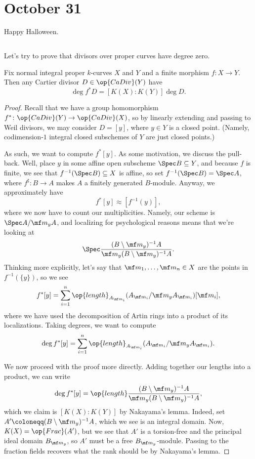 \documentclass[../notes.tex]{subfiles}
\begin{document}
\section{October 31}

Happy Halloween.

\subsection{}
Let's try to prove that divisors over proper curves have degree zero.
\begin{proposition}
	Fix normal integral proper $k$-curves $X$ and $Y$ and a finite morphism $f\colon X\to Y$. Then any Cartier divisor $D\in\op{CaDiv}(Y)$ have
	\[\deg f^*D=[K(X):K(Y)]\deg D.\]
\end{proposition}
\begin{proof}
	Recall that we have a group homomorphism $f^*\colon\op{CaDiv}(Y)\to\op{CaDiv}(X)$, so by linearly extending and passing to Weil divisors, we may consider $D=[y]$, where $y\in Y$ is a closed point. (Namely, codimension-$1$ integral closed subschemes of $Y$ are just closed points.)

	As such, we want to compute $f^*[y]$. As some motivation, we discuss the pull-back. Well, place $y$ in some affine open subscheme $\Spec B\subseteq Y$, and because $f$ is finite, we see that $f^{-1}(\Spec B)\subseteq X$ is affine, so set $f^{-1}(\Spec B)=\Spec A$, where $f^\sharp\colon B\to A$ makes $A$ a finitely generated $B$-module. Anyway, we approximately have
	\[f^*[y]\approx\left[f^{-1}(y)\right],\]
	where we now have to count our multiplicities. Namely, our scheme is $\Spec A/\mf m_yA$, and localizing for psychological reasons means that we're looking at
	\[\Spec\frac{(B\setminus\mf m_y)^{-1}A}{\mf m_y(B\setminus\mf m_y)^{-1}A}.\]
	Thinking more explicitly, let's say that $\mf m_1,\ldots,\mf m_n\in X$ are the points in $f^{-1}(\{y\})$, so we see
	\[f^*[y]=\sum_{i=1}^n\op{length}_{A_{\mf m_i}}(A_{\mf m_i}/\mf m_yA_{\mf m_i})[\mf m_i],\]
	where we have used the decomposition of Artin rings into a product of its localizations. Taking degrees, we want to compute
	\[\deg f^*[y]=\sum_{i=1}^n\op{length}_{A_{\mf m_i}}(A_{\mf m_i}/\mf m_yA_{\mf m_i}).\]

	We now proceed with the proof more directly. Adding together our lengths into a product, we can write
	\[\deg f^*[y]=\op{length}\frac{(B\setminus\mf m_y)^{-1}A}{\mf m_y(B\setminus\mf m_y)^{-1}A},\]
	which we claim is $[K(X):K(Y)]$ by Nakayama's lemma. Indeed, set $A'\coloneqq(B\setminus\mf m_y)^{-1}A$, which we see is an integral domain. Now, $K(X)=\op{Frac}(A')$, but we see that $A'$ is a torsion-free and the principal ideal domain $B_{\mf m_y}$, so $A'$ must be a free $B_{\mf m_y}$-module. Passing to the fraction fields recovers what the rank should be by Nakayama's lemma.
\end{proof}
\end{document}
